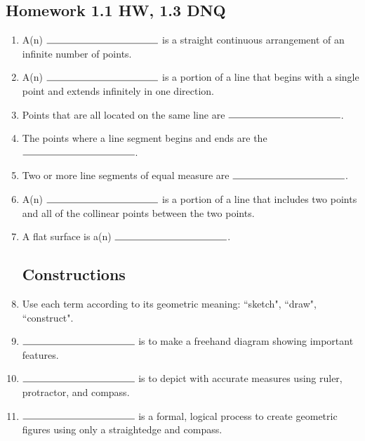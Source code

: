 \documentclass[12pt, oneside]{article}
\begin{document}
\subsection*{Homework 1.1 HW, 1.3 DNQ}

\begin{enumerate}
  \item A(n) $\rule{4cm}{0.15mm}$ is a straight continuous arrangement of an infinite number of points.
  \item A(n) $\rule{4cm}{0.15mm}$ is a portion of a line that begins with a single point and extends infinitely in one direction.
  \item Points that are all located on the same line are $\rule{4cm}{0.15mm}$.
  \item The points where a line segment begins and ends are the $\rule{4cm}{0.15mm}$.
  \item Two or more line segments of equal measure are $\rule{4cm}{0.15mm}$.
  \item A(n) $\rule{4cm}{0.15mm}$ is a portion of a line that includes two points and all of the collinear points between the two points.
  \item A flat surface is a(n) $\rule{4cm}{0.15mm}$.

\subsection*{Constructions}
  \item Use each term according to its geometric meaning: ``sketch", ``draw", ``construct".
  \item $\rule{4cm}{0.15mm}$ is to make a freehand diagram showing important features.
  \item $\rule{4cm}{0.15mm}$ is to depict with accurate measures using ruler, protractor, and compass.
  \item $\rule{4cm}{0.15mm}$ is a formal, logical process to create geometric figures using only a straightedge and compass.


\end{enumerate}
\end{document}
